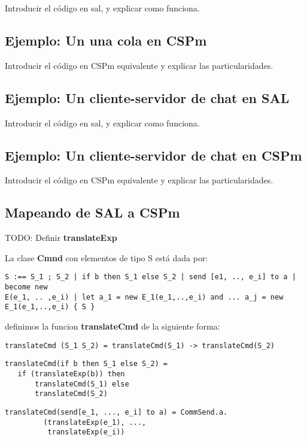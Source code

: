 \documentclass[fleqn]{article}
\begin{document}
Introducir el código en sal, y explicar como funciona.
\subsection{Ejemplo: Un una cola en CSPm}

Introducir el código en CSPm equivalente y explicar las particularidades.

\subsection{Ejemplo: Un cliente-servidor de chat en SAL}

Introducir el código en sal, y explicar como funciona.

\subsection{Ejemplo: Un cliente-servidor de chat en CSPm}

Introducir el código en CSPm equivalente y explicar las particularidades.

\subsection{Mapeando de SAL a CSPm}

TODO: Definir \textbf{translateExp}

La clase \textbf{Cmnd} con elementos de tipo S está dada por:

\begin{verbatim}
S :== S_1 ; S_2 | if b then S_1 else S_2 | send [e1, .., e_i] to a | become new
E(e_1, .. ,e_i) | let a_1 = new E_1(e_1,..,e_i) and ... a_j = new
E_1(e_1,..,e_i) { S } 
\end{verbatim}

definimos la funcion \textbf{translateCmd} de la siguiente forma:

\begin{verbatim}
translateCmd (S_1 S_2) = translateCmd(S_1) -> translateCmd(S_2)
\end{verbatim}


\begin{verbatim}
translateCmd(if b then S_1 else S_2) = 
   if (translateExp(b)) then
       translateCmd(S_1) else 
       translateCmd(S_2)
\end{verbatim}

\begin{verbatim}
translateCmd(send[e_1, ..., e_i] to a) = CommSend.a.
         (translateExp(e_1), ..., 
          translateExp(e_i)) 
\end{verbatim}
\end{document}
